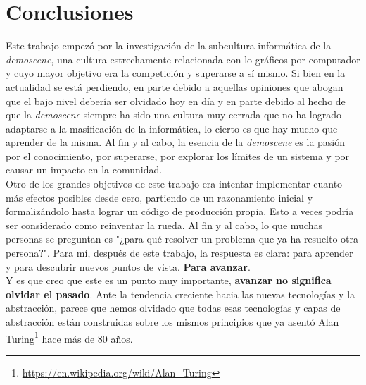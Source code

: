 
\chapter{Conclusiones}

Este trabajo empezó por la investigación de la subcultura informática de la \emph{demoscene}, una cultura estrechamente relacionada con lo gráficos por computador y cuyo mayor objetivo era la competición y superarse a sí mismo. Si bien en la actualidad se está perdiendo, en parte debido a aquellas opiniones que abogan que el bajo nivel debería ser olvidado hoy en día y en parte debido al hecho de que la \emph{demoscene} siempre ha sido una cultura muy cerrada que no ha logrado adaptarse a la masificación de la informática, lo cierto es que hay mucho que aprender de la misma. Al fin y al cabo, la esencia de la \emph{demoscene} es la pasión por el conocimiento, por superarse, por explorar los límites de un sistema y por causar un impacto en la comunidad.\\

Otro de los grandes objetivos de este trabajo era intentar implementar cuanto más efectos posibles desde cero, partiendo de un razonamiento inicial y formalizándolo hasta lograr un código de producción propia. Esto a veces podría ser considerado como reinventar la rueda. Al fin y al cabo, lo que muchas personas se preguntan es "¿para qué resolver un problema que ya ha resuelto otra persona?". Para mí, después de este trabajo, la respuesta es clara: para aprender y para descubrir nuevos puntos de vista. \textbf{Para avanzar}.\\

Y es que creo que este es un punto muy importante, \textbf{avanzar no significa olvidar el pasado}. Ante la tendencia creciente hacia las nuevas tecnologías y la abstracción, parece que hemos olvidado que todas esas tecnologías y capas de abstracción están construidas sobre los mismos principios que ya asentó Alan Turing\footnote{\url{https://en.wikipedia.org/wiki/Alan_Turing}} hace más de 80 años.\\

